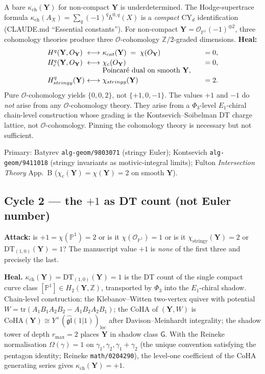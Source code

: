 \documentclass[11pt]{amsart}
\theoremstyle{definition}
\providecommand{\CoHA}{\mathrm{CoHA}}
\providecommand{\bY}{\mathbf{Y}}
\providecommand{\cO}{\mathcal{O}}
\providecommand{\bZ}{\mathbb{Z}}
\providecommand{\bP}{\mathbb{P}}
\providecommand{\fgl}{\mathfrak{gl}}
\providecommand{\tr}{\mathrm{tr}}
\begin{document}
A bare $\kappa_{\mathrm{ch}}(\bY)$ for non-compact $\bY$ is
underdetermined. The Hodge-supertrace formula
$\kappa_{\mathrm{ch}}(A_X) = \sum_q (-1)^q h^{0,q}(X)$ is a
\emph{compact} CY$_d$ identification (CLAUDE.md ``Essential
constants''). For non-compact $\bY = \cO_{\bP^1}(-1)^{\oplus 2}$,
three cohomology theories produce three $\cO$-cohomology
$\bZ/2$-graded dimensions. \textbf{Heal:}
\[
 \begin{array}{l@{\ }c@{\ }l@{\qquad}c}
  H^q(\bY, \cO_\bY) & \longleftrightarrow &
   \kappa_{\mathrm{cat}}(\bY) \;=\; \chi(\cO_\bY) & = 0,\\[2pt]
  H^q_c(\bY, \cO_\bY) & \longleftrightarrow &
   \chi_c(\cO_\bY) & = 0, \\[-1pt]
   & & \text{Poincaré dual on smooth $\bY$}, \\[2pt]
  H^q_{\mathrm{stringy}}(\bY) &
   \longleftrightarrow & \chi_{\mathrm{stringy}}(\bY) & = 2.
 \end{array}
\]
Pure $\cO$-cohomology yields $\{0, 0, 2\}$, not $\{+1, 0, -1\}$. The
values $+1$ and $-1$ do \emph{not} arise from any
$\cO$-cohomology theory. They arise from a $\Phi_3$-level
$E_1$-chiral chain-level construction whose grading is the
Kontsevich--Soibelman DT charge lattice, not $\cO$-cohomology.
Pinning the cohomology theory is necessary but not sufficient.

Primary: Batyrev \texttt{alg-geom/9803071} (stringy Euler);
Kontsevich \texttt{alg-geom/9411018} (stringy invariants as
motivic-integral limits); Fulton \emph{Intersection Theory}
App.~B ($\chi_c(\bY) = \chi(\bY) = 2$ on smooth $\bY$).

\subsection*{Cycle 2 --- the $+1$ as DT count (not Euler number)}

\textbf{Attack:} is $+1 = \chi(\bP^1) = 2$ or is it
$\chi(\cO_{\bP^1}) = 1$ or is it $\chi_{\mathrm{stringy}}(\bY) = 2$
or $\mathrm{DT}_{(1,0)}(\bY) = 1$? The manuscript value $+1$ is
\emph{none} of the first three and precisely the last.

\textbf{Heal.} $\kappa_{\mathrm{ch}}(\bY) = \mathrm{DT}_{(1,0)}(\bY)
= 1$ is the DT count of the single compact curve class
$[\bP^1] \in H_2(\bY, \bZ)$, transported by $\Phi_3$ into the
$E_1$-chiral shadow. Chain-level construction: the Klebanov--Witten
two-vertex quiver with potential
$W = \tr(A_1 B_1 A_2 B_2 - A_1 B_2 A_2 B_1)$; the CoHA of
$(\bY, W)$ is
$\CoHA(\bY) \cong Y^+(\widehat{\fgl}(1\vert 1))_{\mathrm{loc}}$
after Davison--Meinhardt integrality; the shadow tower of depth
$r_{\max} = 2$ places $\bY$ in shadow class $\mathsf G$. With the
Reineke normalisation $\Omega(\gamma) = 1$ on
$\gamma_1, \gamma_2, \gamma_1 + \gamma_2$ (the unique convention
satisfying the pentagon identity; Reineke
\texttt{math/0204290}), the level-one coefficient of the CoHA
generating series gives $\kappa_{\mathrm{ch}}(\bY) = +1$.
\end{document}
